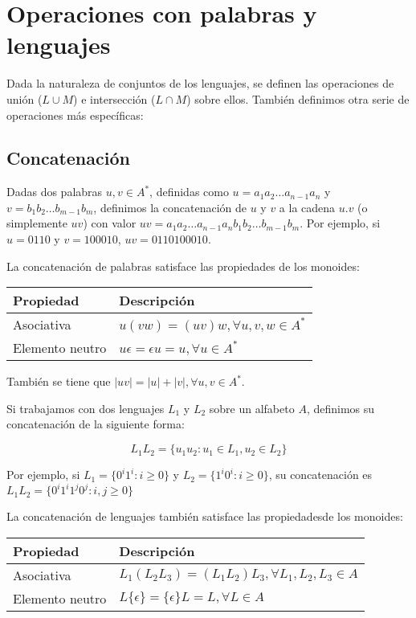 \section{Operaciones con palabras y lenguajes}

Dada la naturaleza de conjuntos de los lenguajes, se definen las operaciones de unión ($L \cup M$) e intersección ($L \cap M$) sobre ellos.
También definimos otra serie de operaciones más específicas:

\subsection{Concatenación}

Dadas dos palabras $u,v \in A^*$, definidas como $u = a_1 a_2 \ldots a_{n-1} a_n$ y $v = b_1 b_2 \ldots b_{m-1} b_m$, definimos la concatenación de $u$ y $v$ a la cadena $u.v$ (o simplemente $uv$) con valor $uv = a_1 a_2\ldots a_{n-1} a_n b_1 b_2\ldots b_{m-1} b_m$.
Por ejemplo, si $u=0110$ y $v=100010$, $uv=0110100010$.

La concatenación de palabras satisface las propiedades de los monoides:

\begin{center}
\begin{tabular}{l l}
	\textbf{Propiedad} & \textbf{Descripción}                          \\
	\toprule
	Asociativa         & $u(vw) = (uv)w, \forall u,v,w \in A^*$          \\
	Elemento neutro    & $u\epsilon = \epsilon u = u, \forall u \in A^*$ \\
\end{tabular}
\end{center}

También se tiene que $|uv| = |u| + |v|, \forall u,v \in A^*$.

Si trabajamos con dos lenguajes $L_1$ y $L_2$ sobre un alfabeto $A$, definimos su concatenación de la siguiente forma:

\[L_1 L_2 = \{u_1 u_2 : u_1 \in L_1, u_2 \in L_2\}\]

Por ejemplo, si $L_1 = \{0^i 1^i : i \geq 0\}$ y $L_2 = \{1^i 0^i : i \geq 0\}$, su concatenación es $L_1 L_2 = \{0^i 1^i 1^j 0^j : i,j \geq 0\}$

La concatenación de lenguajes también satisface las propiedadesde los monoides:

\begin{center}
\begin{tabular}{l l}
	\textbf{Propiedad} & \textbf{Descripción}                                     \\
	\toprule
	Asociativa         & $L_1(L_2 L_3) = (L_1 L_2)L_3, \forall L_1,L_2,L_3 \in A$ \\
	Elemento neutro    & $L\{\epsilon\} = \{\epsilon\}L = L, \forall L \in A$     \\
\end{tabular}
\end{center}

